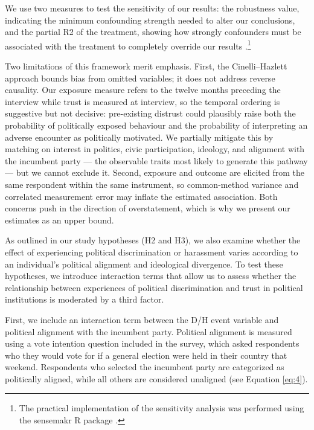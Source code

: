 \documentclass{article}
\begin{document}
We use two measures to test the sensitivity of our results: the robustness value, indicating the minimum confounding strength needed to alter our conclusions, and the partial R2 of the treatment, showing how strongly confounders must be associated with the treatment to completely override our results \parencite{cinelli_making_2020}.\footnote{The practical implementation of the sensitivity analysis was performed using the sensemakr R package \parencite{cinelli_sensemakr_2024}.}

Two limitations of this framework merit emphasis. First, the Cinelli–Hazlett approach bounds bias from omitted variables; it does not address reverse causality. Our exposure measure refers to the twelve months preceding the interview while trust is measured at interview, so the temporal ordering is suggestive but not decisive: pre-existing distrust could plausibly raise both the probability of politically exposed behaviour and the probability of interpreting an adverse encounter as politically motivated. We partially mitigate this by matching on interest in politics, civic participation, ideology, and alignment with the incumbent party — the observable traits most likely to generate this pathway — but we cannot exclude it. Second, exposure and outcome are elicited from the same respondent within the same instrument, so common-method variance and correlated measurement error may inflate the estimated association. Both concerns push in the direction of overstatement, which is why we present our estimates as an upper bound.

As outlined in our study hypotheses (H2 and H3), we also examine whether the effect of experiencing political discrimination or harassment varies according to an individual’s political alignment and ideological divergence. To test these hypotheses, we introduce interaction terms that allow us to assess whether the relationship between experiences of political discrimination and trust in political institutions is moderated by a third factor.

First, we include an interaction term between the D/H event variable and political alignment with the incumbent party. Political alignment is measured using a vote intention question included in the survey, which asked respondents who they would vote for if a general election were held in their country that weekend. Respondents who selected the incumbent party are categorized as politically aligned, while all others are considered unaligned (see Equation \ref{eq:4}).
\end{document}
